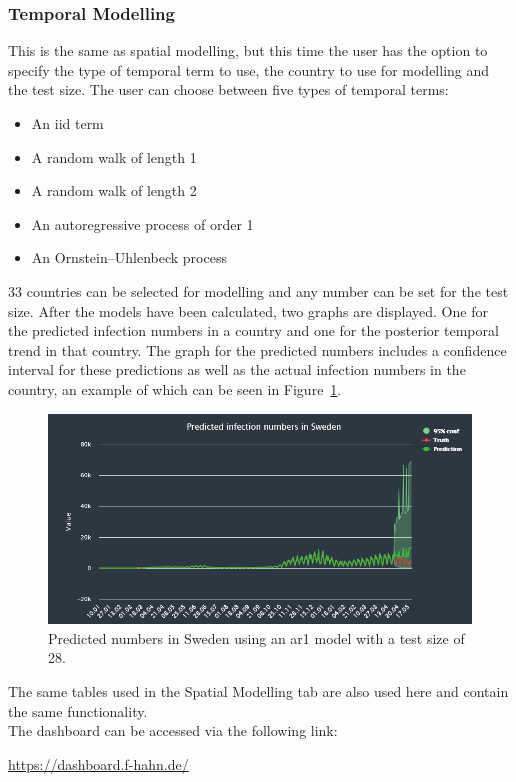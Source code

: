 \subsubsection*{Temporal Modelling}
This is the same as spatial modelling, but this time the user has the option to specify the type of temporal term to use, the country to use for modelling and the test size. The user can choose between five types of temporal terms:
\begin{itemize}
    \item[1.] An iid term
    \item[2.] A random walk of length 1
    \item[3.] A random walk of length 2
    \item[4.] An autoregressive process of order 1
    \item[5.] An Ornstein–Uhlenbeck process
\end{itemize}
33 countries can be selected for modelling and any number can be set for the test size. After the models have been calculated, two graphs are displayed. One for the predicted infection numbers in a country and one for the posterior temporal trend in that country. The graph for the predicted numbers includes a confidence interval for these predictions as well as the actual infection numbers in the country, an example of which can be seen in Figure~\ref{fig:sweden}.
\begin{figure}[H]
    \centering
    \includegraphics[width = \textwidth]{predicted_sweden.png}
    \caption{Predicted numbers in Sweden using an ar1 model with a test size of 28.}
    \label{fig:sweden}
\end{figure}
The same tables used in the Spatial Modelling tab are also used here and contain the same functionality. \\
The dashboard can be accessed via the following link:
\begin{center}
    \href{https://dashboard.f-hahn.de/}{https://dashboard.f-hahn.de/}
\end{center}